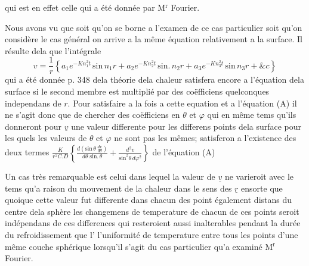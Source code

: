 \documentclass[11pt,a4paper]{article}
\begin{document}
qui est en effet celle qui a été donnée par M$^{\text{r}}$ Fourier.

Nous avons vu que soit qu'on se borne a l'examen de ce cas
particulier soit qu'on considère le cas général  on arrive a la même équation relativement
a la surface.  Il résulte dela que l'intégrale
\[ v = \frac{1}{r}\left\{a_{1}e^{-Kn_{1}^{2}t}\,\text{sin}\,n_{1}r + a_{2}e^{-Kn_{2}^{2}t}\,\text{sin.}\,n_{2}r + a_{3}e^{-Kn_{3}^{2}t}\,\text{sin}\,n_{3}r + \&c\right\} \]
qui a été donnée p. 348 dela théorie dela chaleur
satisfera encore a l'équation dela surface si le second
membre est multiplié par des coëfficiens quelconques
independans de $r$. Pour satisfaire a la fois a cette
equation et a l'équation (A) il ne s'agit donc
que de chercher des coëfficiens en $\theta$ et $\varphi$ 
qui en même tems qu'ils  donneront pour
$\underline{v}$ une valeur differente pour les differens points
dela surface pour les quels les  valeurs de $\theta$ et
$\varphi$ ne sont pas les mêmes; satisferon a l'existence
des deux termes $\frac{K}{r^{2}C.D}\left\{\frac{d\left(\text{sin}\,\theta\,\frac{dv}{d\theta}\right)}{d\theta\;\text{sin.}\,\theta} + \frac{d^{2}v}{\text{sin}^{2}\theta\,d\varphi^{2}}\right\}$
de l'équation (A)



Un cas très remarquable est celui dans lequel la valeur de
$\underline{v}$ ne varieroit avec le tems qu'a raison du mouvement de
la chaleur dans le sens des $\underline{r}$ ensorte que quoique
cette valeur fut differente dans chacun des point également
distans du centre dela sphère les changemens de temperature
de chacun de ces points seroit indépendans de ces
differences qui resteroient aussi inalterables pendant la
durée du refroidissement que l' 
l'uniformité de temperature entre tous les points
d'une même couche sphérique lorsqu'il s'agit du
cas particulier qu'a examiné M$^{\text{r}}$ Fourier.
\end{document}
